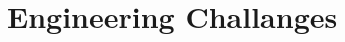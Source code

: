 \documentclass[12pt,oneside,letterpaper]{memoir}
\begin{document}
  \section{Engineering Challanges}










































\end{document}
